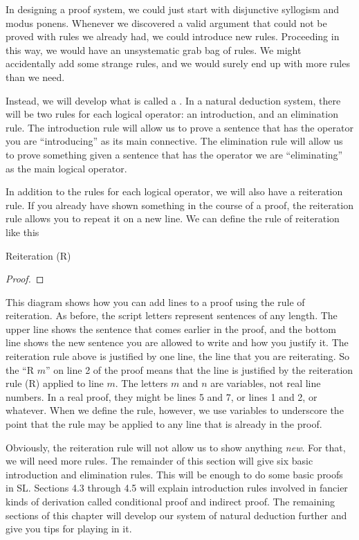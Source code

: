 In designing a proof system, we could just start with disjunctive syllogism and modus ponens. Whenever we discovered a valid argument that could not be proved with rules we already had, we could introduce new rules. Proceeding in this way, we would have an unsystematic grab bag of rules. We might accidentally add some strange rules, and we would surely end up with more rules than we need.

Instead, we will develop what is called a . In a natural deduction system, there will be two rules for each logical operator: an introduction, and an elimination rule. The introduction rule will allow us to prove a sentence that has the operator you are ``introducing'' as its main connective. The elimination rule will allow us to prove something given a sentence that has the operator we are ``eliminating'' as the main logical operator.

In addition to the rules for each logical operator, we will also have a reiteration rule. If you already have shown something in the course of a proof, the reiteration rule allows you to repeat it on a new line. We can define the rule of reiteration like this

Reiteration (R)
\begin{proof}
	 
\end{proof}

This diagram shows how you can add lines to a proof using the rule of reiteration. As before, the script letters represent sentences of any length. The upper line shows the sentence that comes earlier in the proof, and the bottom line shows the new sentence you are allowed to write and how you justify it. The reiteration rule above is justified by one line, the line that you are reiterating. So the ``R $m$'' on line 2 of the proof means that the line is justified by the reiteration rule (R) applied to line $m$. The letters $m$ and $n$ are variables, not real line numbers. In a real proof, they might be lines 5 and 7, or lines 1 and 2, or whatever. When we define the rule, however, we use variables to underscore the point that the rule may be applied to any line that is already in the proof. 

Obviously, the reiteration rule will not allow us to show anything \emph{new}. For that, we will need more rules. The remainder of this section will give six basic introduction and elimination rules. This will be enough to do some basic proofs in SL. Sections 4.3 through 4.5 will explain introduction rules involved in fancier kinds of derivation called conditional proof and indirect proof. The remaining sections of this chapter will develop our system of natural deduction further and give you tips for playing in it.

